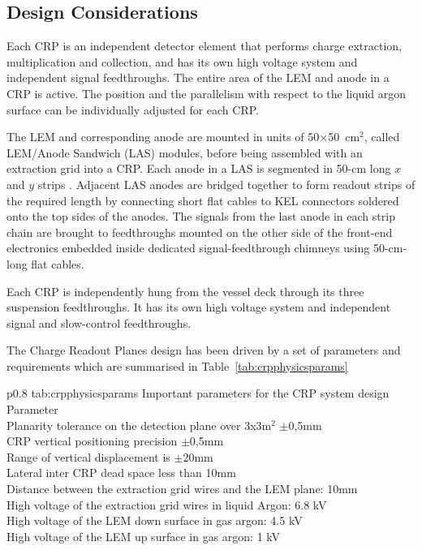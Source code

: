 \subsection{Design Considerations}
\label{sec:fddp-crp-des-consid}

Each CRP is an independent detector element that performs charge
extraction, multiplication and collection, and has its own high voltage system and independent signal feedthroughs. The entire area of the LEM and anode in a CRP is active. The position and the parallelism with respect to the liquid argon surface can be individually adjusted for each CRP.

The LEM and corresponding anode are mounted in units of 50$\times$50~cm$^2$, called LEM/Anode Sandwich (LAS) modules, before being assembled with an extraction grid into a CRP. Each anode in a LAS is segmented in 50-cm long $x$ and $y$ strips . Adjacent LAS anodes are bridged together to form readout strips of the required length by connecting short flat cables to KEL connectors soldered onto the top sides of the anodes. The signals from the last anode in each  strip chain are brought to feedthroughs mounted on the other side of the front-end electronics embedded inside dedicated signal-feedthrough chimneys using 50-cm-long flat cables.

Each CRP is independently hung from the vessel deck through its three
suspension feedthroughs. It has its own high voltage system and  independent signal and slow-control feedthroughs.

The Charge Readout Planes design has been driven by a set of parameters and requirements which are summarised in Table~\ref{tab:crpphysicsparams} 

\begin{dunetable}
{p{0.8\textwidth}}
{tab:crpphysicsparams}
{Important parameters for the CRP system design}   
Parameter \\ \toprowrule
 Planarity tolerance on the detection plane over 3x3m$^{2}$  $\pm$0,5mm \\ \colhline
 CRP vertical positioning precision  $\pm$0,5mm \\ \colhline
 Range of vertical displacement is $\pm$20mm\\ \colhline
 Lateral inter CRP dead space  less than 10mm \\\colhline
 Distance between the extraction grid wires and the LEM plane: 10mm\\ \colhline 
 High voltage of the extraction grid wires in liquid Argon: 6.8 kV \\ \colhline
 High voltage of the LEM down surface in gas argon: 4.5 kV\\ \colhline
 High voltage of the LEM up surface in gas argon: 1 kV\\ \colhline
\end{dunetable}


